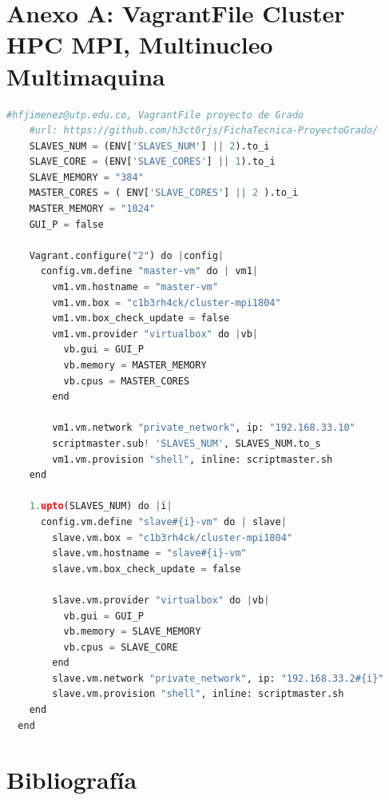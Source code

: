 \documentclass[letterpaper, 12pt, oneside]{article}
\begin{document}
    \section{Anexo A: VagrantFile Cluster HPC MPI, Multinucleo Multimaquina}
    \begin{lstlisting}[language=Python]
    #hfjimenez@utp.edu.co, VagrantFile proyecto de Grado
    #url: https://github.com/h3ct0rjs/FichaTecnica-ProyectoGrado/
    SLAVES_NUM = (ENV['SLAVES_NUM'] || 2).to_i
    SLAVE_CORE = (ENV['SLAVE_CORES'] || 1).to_i
    SLAVE_MEMORY = "384"
    MASTER_CORES = ( ENV['SLAVE_CORES'] || 2 ).to_i
    MASTER_MEMORY = "1024"
    GUI_P = false

    Vagrant.configure("2") do |config|
      config.vm.define "master-vm" do | vm1| 
        vm1.vm.hostname = "master-vm"
        vm1.vm.box = "c1b3rh4ck/cluster-mpi1804"
        vm1.vm.box_check_update = false        
        vm1.vm.provider "virtualbox" do |vb|
          vb.gui = GUI_P
          vb.memory = MASTER_MEMORY
          vb.cpus = MASTER_CORES
        end
        
        vm1.vm.network "private_network", ip: "192.168.33.10"
        scriptmaster.sub! 'SLAVES_NUM', SLAVES_NUM.to_s
        vm1.vm.provision "shell", inline: scriptmaster.sh
    end
  
    1.upto(SLAVES_NUM) do |i|
      config.vm.define "slave#{i}-vm" do | slave| 
        slave.vm.box = "c1b3rh4ck/cluster-mpi1804"
        slave.vm.hostname = "slave#{i}-vm"
        slave.vm.box_check_update = false
  
        slave.vm.provider "virtualbox" do |vb|
          vb.gui = GUI_P
          vb.memory = SLAVE_MEMORY
          vb.cpus = SLAVE_CORE
        end
        slave.vm.network "private_network", ip: "192.168.33.2#{i}"
        slave.vm.provision "shell", inline: scriptmaster.sh
    end
  end
\end{lstlisting}
\newpage
    \section{Bibliografía}
    
    
    \nocite{*}
    
\end{document}
